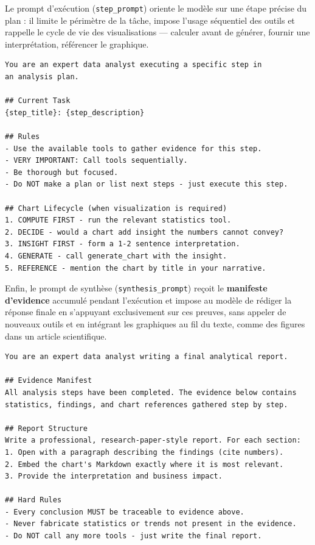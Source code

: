 Le prompt d'exécution (\texttt{step\_prompt}) oriente le modèle sur une étape précise du plan : il limite le périmètre de la tâche, impose l'usage séquentiel des outils et rappelle le cycle de vie des visualisations — calculer avant de générer, fournir une interprétation, référencer le graphique.

\begin{lstlisting}[caption={Prompt d'exécution (extrait)}]
You are an expert data analyst executing a specific step in
an analysis plan.

## Current Task
{step_title}: {step_description}

## Rules
- Use the available tools to gather evidence for this step.
- VERY IMPORTANT: Call tools sequentially.
- Be thorough but focused.
- Do NOT make a plan or list next steps - just execute this step.

## Chart Lifecycle (when visualization is required)
1. COMPUTE FIRST - run the relevant statistics tool.
2. DECIDE - would a chart add insight the numbers cannot convey?
3. INSIGHT FIRST - form a 1-2 sentence interpretation.
4. GENERATE - call generate_chart with the insight.
5. REFERENCE - mention the chart by title in your narrative.
\end{lstlisting}

Enfin, le prompt de synthèse (\texttt{synthesis\_prompt}) reçoit le \textbf{manifeste d'evidence} accumulé pendant l'exécution et impose au modèle de rédiger la réponse finale en s'appuyant exclusivement sur ces preuves, sans appeler de nouveaux outils et en intégrant les graphiques au fil du texte, comme des figures dans un article scientifique.

\begin{lstlisting}[caption={Prompt de synthèse (extrait)}]
You are an expert data analyst writing a final analytical report.

## Evidence Manifest
All analysis steps have been completed. The evidence below contains
statistics, findings, and chart references gathered step by step.

## Report Structure
Write a professional, research-paper-style report. For each section:
1. Open with a paragraph describing the findings (cite numbers).
2. Embed the chart's Markdown exactly where it is most relevant.
3. Provide the interpretation and business impact.

## Hard Rules
- Every conclusion MUST be traceable to evidence above.
- Never fabricate statistics or trends not present in the evidence.
- Do NOT call any more tools - just write the final report.
\end{lstlisting}

